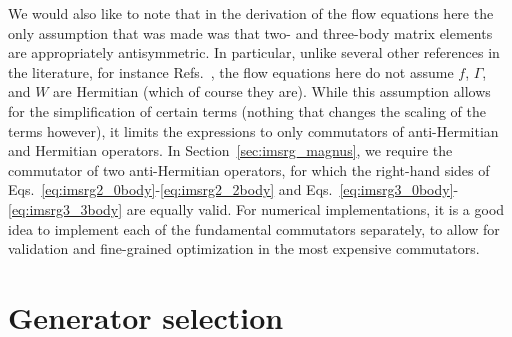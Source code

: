We would also like to note that
in the derivation of the flow equations here
the only assumption that was made was that
two- and three-body matrix elements are appropriately antisymmetric.
In particular, unlike several other references in the literature,
for instance Refs.~\cite{Herg15imsrgphysrep,Tsuk10imsrg},
the flow equations here do not assume $f$, $\Gamma$, and $W$ are Hermitian
(which of course they are).
While this assumption allows for the simplification of certain terms
(nothing that changes the scaling of the terms however),
it limits the expressions to only commutators of anti-Hermitian and Hermitian operators.
In Section~\ref{sec:imsrg_magnus},
we require the commutator of two anti-Hermitian operators,
for which the right-hand sides of
Eqs.~\eqref{eq:imsrg2_0body}-\eqref{eq:imsrg2_2body}
and Eqs.~\eqref{eq:imsrg3_0body}-\eqref{eq:imsrg3_3body}
are equally valid.
For numerical implementations,
it is a good idea to implement each of the fundamental commutators separately,
to allow for validation and fine-grained optimization in the most expensive commutators.

\section{Generator selection}\label{sec:imsrg_generator}

